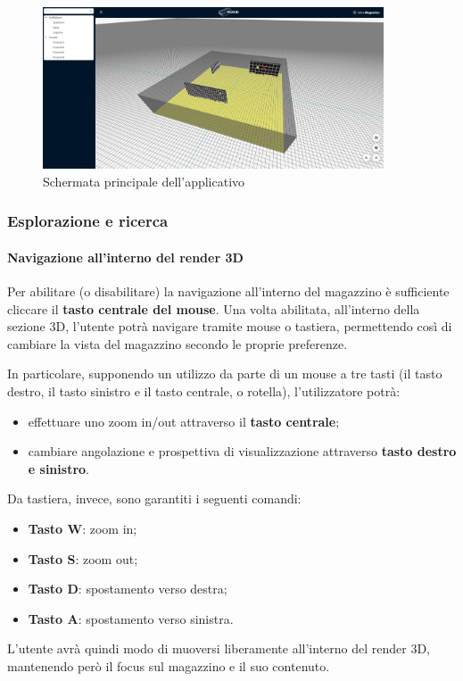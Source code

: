         \begin{figure}[h!]
            \centering
            \includegraphics[width=0.9\textwidth]{images/schermata_principale.png}
            \caption{Schermata principale dell'applicativo}
        \end{figure}

        \subsubsection{Esplorazione e ricerca}\label{sec:principale:esplorare}
            \paragraph{Navigazione all'interno del render 3D} \label{sec:principale:esplorare:navigare}
               Per abilitare (o disabilitare) la navigazione all'interno del magazzino è sufficiente cliccare il \textbf{tasto centrale del mouse}. 
               Una volta abilitata, all'interno della sezione 3D, l'utente potrà navigare tramite mouse o tastiera, permettendo così di cambiare la vista del magazzino secondo le proprie preferenze.
               
                In particolare, supponendo un utilizzo da parte di un mouse a tre tasti (il tasto destro, il tasto sinistro e il tasto centrale, o rotella), l'utilizzatore potrà:
                \begin{itemize}
                    \item effettuare uno zoom in/out attraverso il \textbf{tasto centrale};
                    \item cambiare angolazione e prospettiva di visualizzazione attraverso \textbf{tasto destro e sinistro}.
                \end{itemize}
                Da tastiera, invece, sono garantiti i seguenti comandi: 
                \begin{itemize}
                    \item \textbf{Tasto W}: zoom in;
                    \item \textbf{Tasto S}: zoom out;
                    \item \textbf{Tasto D}: spostamento verso destra;
                    \item \textbf{Tasto A}: spostamento verso sinistra.
                \end{itemize}
                L'utente avrà quindi modo di muoversi liberamente all'interno del render 3D, mantenendo però il focus sul magazzino e il suo contenuto. 


